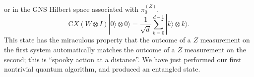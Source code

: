 or in the GNS Hilbert space associated with $\pi^{(Z)}_0$,
\[
  \text{C}X (W\otimes I)|0\rangle\otimes 0\rangle =
  \frac{1}{\sqrt{d}}\sum_{k=0}^{d-1} |k\rangle\otimes k\rangle.
\]
This state has the miraculous property that the outcome of a $Z$
measurement on the first system automatically matches the outcome of a
$Z$ measurement on the second; this is ``spooky action at a distance''.
We have just performed our first nontrivial quantum algorithm, and
produced an entangled state.



